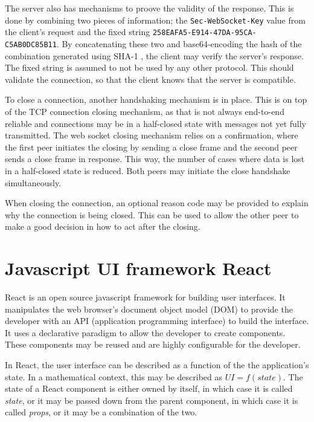 The server also has mechanisms to proove the validity of the response. This is done by combining two pieces of information; the \texttt{Sec-WebSocket-Key} value from the client's request and the fixed string \texttt{258EAFA5-E914-47DA-95CA-C5AB0DC85B11}. By concatenating these two and base64-encoding \cite{base64} the hash of the combination generated using SHA-1 \cite{RFC3174}, the client may verify the server's response. The fixed string is assumed to not be used by any other protocol. This should validate the connection, so that the client knows that the server is compatible.

To close a connection, another handshaking mechanism is in place. This is on top of the TCP connection closing mechanism, as that is not always end-to-end reliable and connections may be in a half-closed state with messages not yet fully transmitted. \cite[section 4.2.2.13]{RFC1122} The web socket closing mechanism relies on a confirmation, where the first peer initiates the closing by sending a close frame and the second peer sends a close frame in response. This way, the number of cases where data is lost in a half-closed state is reduced. Both peers may initiate the close handshake simultaneously.

When closing the connection, an optional reason code may be provided to explain why the connection is being closed. This can be used to allow the other peer to make a good decision in how to act after the closing.

\section{Javascript UI framework React}

React is an open source javascript framework for building user interfaces. It manipulates the web browser's document object model (DOM) to provide the developer with an API (application programming interface) to build the interface. It uses a declarative paradigm to allow the developer to create components. \cite{react} These components may be reused and are highly configurable for the developer.

In React, the user interface can be described as a function of the the application's state. In a mathematical context, this may be described as $UI = f(state)$. The state of a React component is either owned by itself, in which case it is called \emph{state}, or it may be passed down from the parent component, in which case it is called \emph{props}, or it may be a combination of the two.

